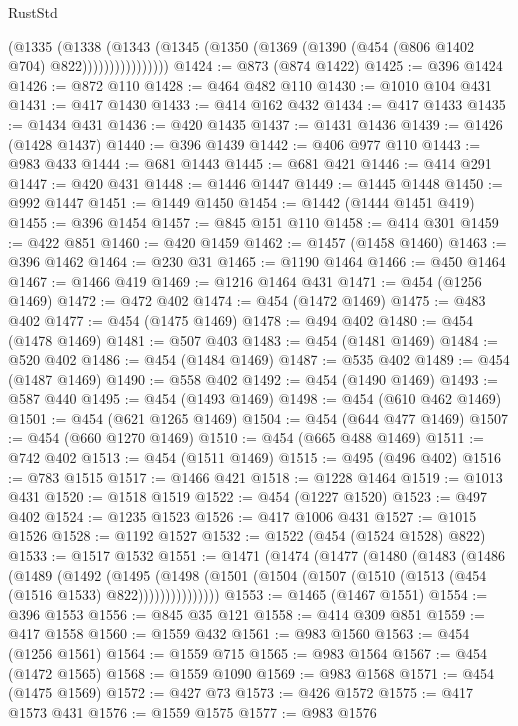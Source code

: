 \begin{lexlean}{RustStd}
\begin{coremodule}
                    (@1335
                      (@1338
                        (@1343
                          (@1345 (@1350 (@1369 (@1390 (@454 (@806 @1402 @704) @822))))))))))))))))
@1424 := @873 (@874 @1422)
@1425 := @396 @1424
@1426 := @872 @110
@1428 := @464 @482 @110
@1430 := @1010 @104 @431
@1431 := @417 @1430
@1433 := @414 @162 @432
@1434 := @417 @1433
@1435 := @1434 @431
@1436 := @420 @1435
@1437 := @1431 @1436
@1439 := @1426 (@1428 @1437)
@1440 := @396 @1439
@1442 := @406 @977 @110
@1443 := @983 @433
@1444 := @681 @1443
@1445 := @681 @421
@1446 := @414 @291
@1447 := @420 @431
@1448 := @1446 @1447
@1449 := @1445 @1448
@1450 := @992 @1447
@1451 := @1449 @1450
@1454 := @1442 (@1444 @1451 @419)
@1455 := @396 @1454
@1457 := @845 @151 @110
@1458 := @414 @301
@1459 := @422 @851
@1460 := @420 @1459
@1462 := @1457 (@1458 @1460)
@1463 := @396 @1462
@1464 := @230 @31
@1465 := @1190 @1464
@1466 := @450 @1464
@1467 := @1466 @419
@1469 := @1216 @1464 @431
@1471 := @454 (@1256 @1469)
@1472 := @472 @402
@1474 := @454 (@1472 @1469)
@1475 := @483 @402
@1477 := @454 (@1475 @1469)
@1478 := @494 @402
@1480 := @454 (@1478 @1469)
@1481 := @507 @403
@1483 := @454 (@1481 @1469)
@1484 := @520 @402
@1486 := @454 (@1484 @1469)
@1487 := @535 @402
@1489 := @454 (@1487 @1469)
@1490 := @558 @402
@1492 := @454 (@1490 @1469)
@1493 := @587 @440
@1495 := @454 (@1493 @1469)
@1498 := @454 (@610 @462 @1469)
@1501 := @454 (@621 @1265 @1469)
@1504 := @454 (@644 @477 @1469)
@1507 := @454 (@660 @1270 @1469)
@1510 := @454 (@665 @488 @1469)
@1511 := @742 @402
@1513 := @454 (@1511 @1469)
@1515 := @495 (@496 @402)
@1516 := @783 @1515
@1517 := @1466 @421
@1518 := @1228 @1464
@1519 := @1013 @431
@1520 := @1518 @1519
@1522 := @454 (@1227 @1520)
@1523 := @497 @402
@1524 := @1235 @1523
@1526 := @417 @1006 @431
@1527 := @1015 @1526
@1528 := @1192 @1527
@1532 := @1522 (@454 (@1524 @1528) @822)
@1533 := @1517 @1532
@1551 := @1471
    (@1474
      (@1477
        (@1480
          (@1483
            (@1486
              (@1489
                (@1492
                  (@1495
                    (@1498
                      (@1501 (@1504 (@1507 (@1510 (@1513 (@454 (@1516 @1533) @822)))))))))))))))
@1553 := @1465 (@1467 @1551)
@1554 := @396 @1553
@1556 := @845 @35 @121
@1558 := @414 @309 @851
@1559 := @417 @1558
@1560 := @1559 @432
@1561 := @983 @1560
@1563 := @454 (@1256 @1561)
@1564 := @1559 @715
@1565 := @983 @1564
@1567 := @454 (@1472 @1565)
@1568 := @1559 @1090
@1569 := @983 @1568
@1571 := @454 (@1475 @1569)
@1572 := @427 @73
@1573 := @426 @1572
@1575 := @417 @1573 @431
@1576 := @1559 @1575
@1577 := @983 @1576

\end{coremodule}
\end{lexlean}
